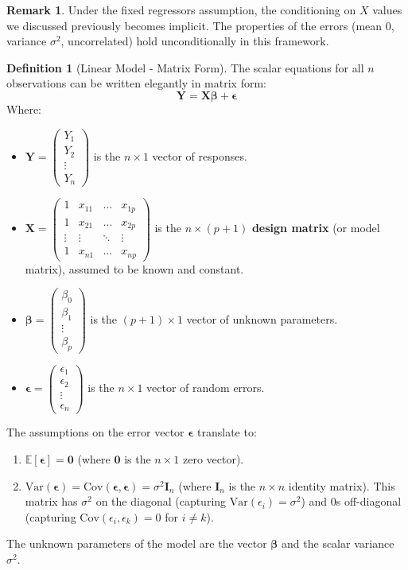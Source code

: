 \documentclass[11pt, letterpaper]{article}
\theoremstyle{definition}
\newtheorem{definition}[theorem]{Definition}
\newtheorem{remark}[theorem]{Remark}
\newcommand{\E}{\mathbb{E}}
\newcommand{\Var}{\text{Var}}
\newcommand{\Cov}{\text{Cov}}
\newcommand{\mat}[1]{\mathbf{#1}} %
\newcommand{\vect}[1]{\boldsymbol{#1}} %
\begin{document}
\begin{remark}
Under the fixed regressors assumption, the conditioning on $X$ values we discussed previously becomes implicit. The properties of the errors (mean 0, variance $\sigma^2$, uncorrelated) hold unconditionally in this framework.
\end{remark}

\begin{definition}[Linear Model - Matrix Form]
The scalar equations for all $n$ observations can be written elegantly in matrix form:
\[
\vect{Y} = \mat{X}\vect{\beta} + \vect{\epsilon}
\]
Where:
\begin{itemize}
    \item $\vect{Y} = \begin{pmatrix} Y_1 \\ Y_2 \\ \vdots \\ Y_n \end{pmatrix}$ is the $n \times 1$ vector of responses.
    \item $\mat{X} = \begin{pmatrix} 1 & x_{11} & \dots & x_{1p} \\ 1 & x_{21} & \dots & x_{2p} \\ \vdots & \vdots & \ddots & \vdots \\ 1 & x_{n1} & \dots & x_{np} \end{pmatrix}$ is the $n \times (p+1)$ \textbf{design matrix} (or model matrix), assumed to be known and constant.
    \item $\vect{\beta} = \begin{pmatrix} \beta_0 \\ \beta_1 \\ \vdots \\ \beta_p \end{pmatrix}$ is the $(p+1) \times 1$ vector of unknown parameters.
    \item $\vect{\epsilon} = \begin{pmatrix} \epsilon_1 \\ \epsilon_2 \\ \vdots \\ \epsilon_n \end{pmatrix}$ is the $n \times 1$ vector of random errors.
\end{itemize}
The assumptions on the error vector $\vect{\epsilon}$ translate to:
\begin{enumerate}
    \item $\E[\vect{\epsilon}] = \vect{0}$ (where $\vect{0}$ is the $n \times 1$ zero vector).
    \item $\Var(\vect{\epsilon}) = \Cov(\vect{\epsilon}, \vect{\epsilon}) = \sigma^2 \mat{I}_n$ (where $\mat{I}_n$ is the $n \times n$ identity matrix). This matrix has $\sigma^2$ on the diagonal (capturing $\Var(\epsilon_i)=\sigma^2$) and 0s off-diagonal (capturing $\Cov(\epsilon_i, \epsilon_k)=0$ for $i \ne k$).
\end{enumerate}
The unknown parameters of the model are the vector $\vect{\beta}$ and the scalar variance $\sigma^2$.
\end{definition}
\end{document}
